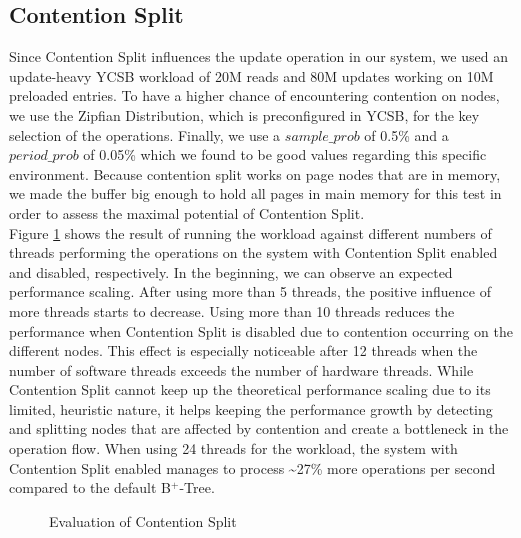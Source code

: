 \documentclass[acmlarge,nonacm,dvipsnames]{acmart}
\begin{document}
\subsection{Contention Split}
Since Contention Split influences the update operation in our system, we used an update-heavy YCSB workload of 20M reads and 80M updates working on 10M preloaded entries. To have a higher chance of encountering contention on nodes, we use the Zipfian Distribution, which is preconfigured in YCSB, for the key selection of the operations. Finally, we use a $sample\_prob$ of 0.5\% and a $period\_prob$ of 0.05\% which we found to be good values regarding this specific environment. Because contention split works on page nodes that are in memory, we made the buffer big enough to hold all pages in main memory for this test in order to assess the maximal potential of Contention Split.\\
Figure \ref{fig:chart_1} shows the result of running the workload against different numbers of threads performing the operations on the system with Contention Split enabled and disabled, respectively. In the beginning, we can observe an expected performance scaling. After using more than 5 threads, the positive influence of more threads starts to decrease. Using more than 10 threads reduces the performance when Contention Split is disabled due to contention occurring on the different nodes. This effect is especially noticeable after 12 threads when the number of software threads exceeds the number of hardware threads. While Contention Split cannot keep up the theoretical performance scaling due to its limited, heuristic nature, it helps keeping the performance growth by detecting and splitting nodes that are affected by contention and create a bottleneck in the operation flow. When using 24 threads for the workload, the system with Contention Split enabled manages to process \textasciitilde27\% more operations per second compared to the default B$^+$-Tree.
\begin{figure}
\caption{Evaluation of Contention Split}
\label{fig:chart_1}
\end{figure}
\end{document}
